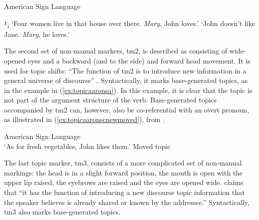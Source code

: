 \begin{exe}
\ex American Sign Language \label{tmoneexamples}\begin{xlist} 
\ex {}   $\textrm{\textit{t}}$\textsubscript{i}
\glt `Four women live in that house over there. \textit{Mary}, John loves.' \label{ex:tmoneexamplesa}
\ex {}  
\glt `John doesn't like Jane. \textit{Mary}, he loves.' \label{ex:tmoneexamplesb}
\end{xlist}
\end{exe} 

\noindent The second set of non-manual markers, tm2, is described as consisting of wide-opened eyes and a backward (and to the side) and forward head movement. It is used for topic shifts: ``The function of tm2 is to introduce new information in a general universe of discourse'' \citep[79]{aarons1996topics}. Syntactically, it marks base-generated topics, as in the example in (\ref{ex:topicaaronsa}). In this example, it is clear that the topic is not part of the argument structure of the verb. Base-generated topics accompanied by tm2 can, however, also be co-referential with an overt pronoun, as illustrated in (\ref{ex:topicaaronscnewmoved}), from \citet[79]{aarons1996topics}.

\begin{exe}
\ex American Sign Language \\  
\glt `As for fresh vegetables, John likes them.' \label{ex:topicaaronscnewmoved} \hfill Moved topic
\end{exe} 

\noindent The last topic marker, tm3, consists of a more complicated set of non-manual markings: the head is in a slight forward position, the mouth is open with the upper lip raised, the eyebrows are raised and the eyes are opened wide. \citet[81]{aarons1996topics} claims that ``it has the function of introducing a new discourse topic information that the speaker believes is already shared or known by the addressee.'' Syntactically, tm3 also marks base-generated topics.

